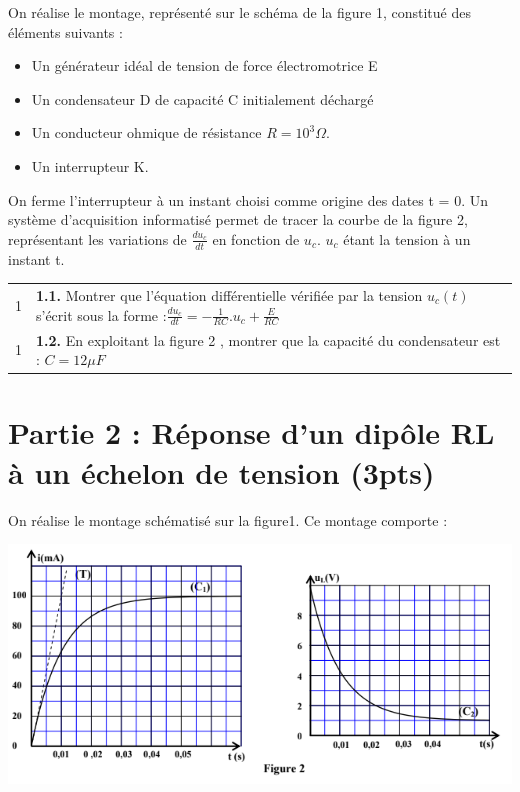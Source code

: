 \documentclass[12pt]{article}
\begin{document}
On réalise le montage, représenté sur le schéma de
la figure 1, constitué des éléments suivants :
\begin{itemize}
	\item Un générateur idéal de tension de force électromotrice E
	\item Un condensateur D de capacité C initialement déchargé
	\item Un conducteur ohmique de résistance $R = 10^3\Omega$.
	\item Un interrupteur K.

\end{itemize}
On ferme l’interrupteur à un instant choisi comme origine des
dates t = 0. Un système d’acquisition informatisé permet de
tracer la courbe de la figure 2, représentant les variations de $\frac{du_c}{dt}$
en fonction de $u_c$. 
$u_c$ étant la tension à un instant t.

\begin{tabular}{c|l}
	1 & \makecell[l]{ \textbf{1.1. }Montrer que l’équation différentielle vérifiée par la tension $u_c(t)$ \\s’écrit sous la forme :$\frac{du_c}{dt} = -\frac{1}{RC}.u_c + \frac{E}{RC}$ } \\

	1 & \makecell[l]{\textbf{1.2. }En exploitant la figure 2 , montrer que la capacité du
	\\condensateur est : $C = 12\mu F$ }\\
\end{tabular}

\section*{Partie 2 : Réponse d’un dipôle RL à un échelon de tension \dotfill(3pts) }
On réalise le montage schématisé sur la figure1.
Ce montage comporte :

\begin{center}
  \includegraphics[width=1\textwidth]{./Rl00.png}
\end{center}
\end{document}
